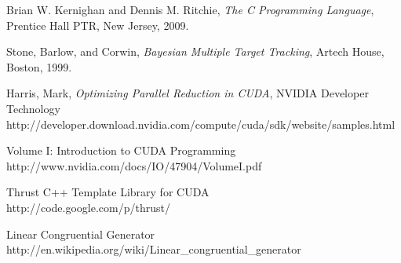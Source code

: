 \documentclass{article}
\begin{document}
\begin{thebibliography}{9}

  Brian W. Kernighan and Dennis M. Ritchie,
  \emph{The C Programming Language},
  Prentice Hall PTR, New Jersey,
  2009.

  Stone, Barlow, and Corwin,
  \emph{Bayesian Multiple Target Tracking},
  Artech House, Boston,
  1999.

   Harris, Mark,
   \emph{Optimizing Parallel Reduction in CUDA},
   NVIDIA Developer Technology \\
   http://developer.download.nvidia.com/compute/cuda/sdk/website/samples.html

   Volume I: Introduction to CUDA Programming \\
   http://www.nvidia.com/docs/IO/47904/VolumeI.pdf

   Thrust C++ Template Library for CUDA \\
   http://code.google.com/p/thrust/

   Linear Congruential Generator \\
   http://en.wikipedia.org/wiki/Linear\_congruential\_generator

\end{thebibliography}
\end{document}
